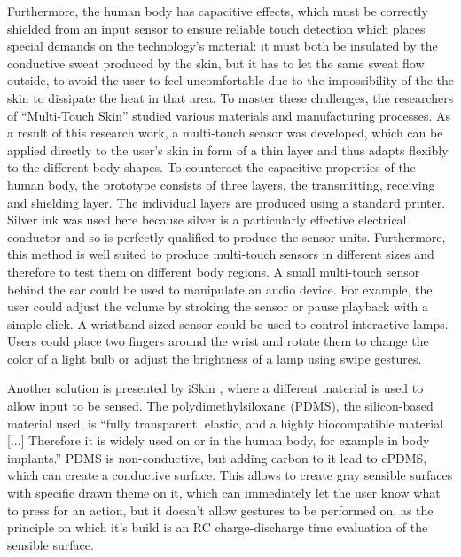 \documentclass{sigchi}
\begin{document}
Furthermore, the human body has capacitive effects, which must be correctly shielded from an input sensor to ensure reliable touch detection which places special demands on the technology's material: it must both be insulated by the conductive sweat produced by the skin, but it has to let the same sweat flow outside, to avoid the user to feel uncomfortable due to the impossibility of the the skin to dissipate the heat in that area. \cite{ulbrich2} %
To master these challenges, the researchers of “Multi-Touch Skin” \cite{ulbrich2} studied various materials and manufacturing processes. As a result of this research work, a multi-touch sensor was developed, which can be applied directly to the user's skin in form of a thin layer and thus adapts flexibly to the different body shapes. To counteract the capacitive properties of the human body, the prototype consists of three layers, the transmitting, receiving and shielding layer. The individual layers are produced using a standard printer. Silver ink was used here because silver is a particularly effective electrical conductor and so is perfectly qualified to produce the sensor units. Furthermore, this method is well suited to produce multi-touch sensors in different sizes and therefore to test them on different body regions. \cite{ulbrich2}
A small multi-touch sensor behind the ear could be used to manipulate an audio device. For example, the user could adjust the volume by stroking the sensor or pause playback with a simple click. A wristband sized sensor could be used to control interactive lamps. Users could place two fingers around the wrist and rotate them to change the color of a light bulb or adjust the brightness of a lamp using swipe gestures. \cite{ulbrich2}

Another solution is presented by iSkin \cite{iSkin}, where a different material is used to allow input to be sensed. The polydimethylsiloxane (PDMS), the silicon-based material used, is “fully transparent, elastic, and a highly biocompatible material. [...] Therefore it is widely used on or in the human body, for example in body implants.” \cite[p. 2994]{iSkin} PDMS is non-conductive, but adding carbon to it lead to cPDMS, which can create a conductive surface. This allows to create gray sensible surfaces with specific drawn theme on it, which can immediately let the user know what to press for an action, but it doesn’t allow gestures to be performed on, as the principle on which it’s build is an RC charge-discharge time evaluation of the sensible surface.
\end{document}
